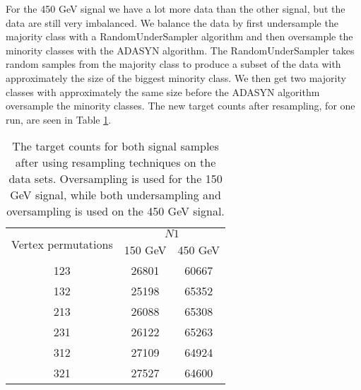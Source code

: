\documentclass[a4paper, american, 12pt]{report}
\begin{document}
	For the 450 GeV signal we have a lot more data than the other signal, but the data are still very imbalanced. We balance the data by first undersample the majority class with a RandomUnderSampler algorithm and then oversample the minority classes with the ADASYN algorithm. The RandomUnderSampler takes random samples from the majority class to produce a subset of the data with approximately the size of the biggest minority class. We then get two majority classes with approximately the same size before the ADASYN algorithm oversample the minority classes. The new target counts after resampling, for one run, are seen in Table \ref{tab:Counts_resample}.
	\begin{table}[htbp!]
		\centering
		\begin{tabular}{ |c|c|c| }
			\hline
			\multirow{2}{*}{Vertex permutations} & \multicolumn{2}{|c|}{$N1$}\\
			\cline{2-3} \rule{0pt}{13pt}
			 & 150 GeV & 450 GeV  \\
			\hline \rule{0pt}{13pt}
			123 & 26801 & 60667 \\
			\hline \rule{0pt}{13pt}
			132 & 25198 & 65352 \\
			\hline \rule{0pt}{13pt}
			213 & 26088 & 65308 \\
			\hline \rule{0pt}{13pt}
			231 & 26122 & 65263 \\
			\hline \rule{0pt}{13pt}
			312 & 27109 & 64924 \\
			\hline \rule{0pt}{13pt}
			321 & 27527 & 64600 \\
			\hline
		\end{tabular}	
		\caption[Target counts after resampling.]{The target counts for both signal samples after using resampling techniques on the data sets. Oversampling is used for the 150 GeV signal, while both undersampling and oversampling is used on the 450 GeV signal.}
		\label{tab:Counts_resample}
	\end{table}
\end{document}
